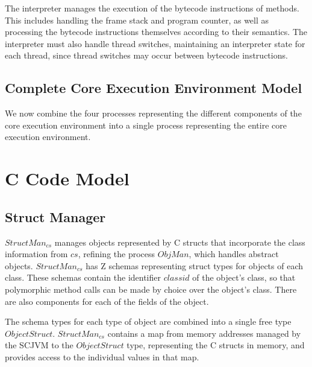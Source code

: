 

The interpreter manages the execution of the bytecode instructions of
methods.
This includes handling the frame stack and program counter, as well as
processing the bytecode instructions themselves according to their
semantics.
The interpreter must also handle thread switches, maintaining an
interpreter state for each thread, since thread switches may occur
between bytecode instructions.





\subsection{Complete Core Execution Environment Model}
\label{complete-cee-subsection}

We now combine the four \Circus{} processes representing the different
components of the core execution environment into a single \Circus{}
process representing the entire core execution environment.



\section{C Code Model}
\label{cee-c-code-section}

\subsection{Struct Manager}
\label{cee-struct-manager-subsection}

$StructMan_{cs}$ manages objects represented by C structs that
incorporate the class information from $cs$, refining the process
$ObjMan$, which handles abstract objects.
$StructMan_{cs}$ has Z schemas representing struct types for objects
of each class.
%
%
These schemas contain the identifier $classid$ of the object's class, so
that polymorphic method calls can be made by choice over the object's
class. 
There are also components for each of the fields of the
object.

The schema types for each type of object are combined into a single
free type $ObjectStruct$.
$StructMan_{cs}$ contains a map from memory addresses managed by the
SCJVM to the $ObjectStruct$ type, representing the C structs in
memory, and provides access to the individual values in that map.

